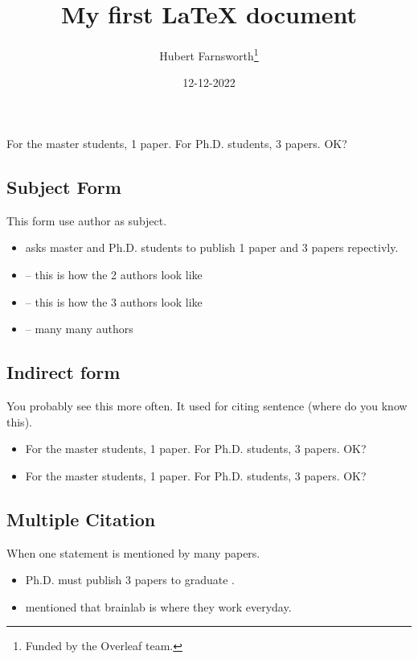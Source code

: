 \documentclass{article}
\title{My first LaTeX document}
\author{Hubert Farnsworth\thanks{Funded by the Overleaf team.}}
\date{12-12-2022}
\begin{document}
\maketitle
\tableofcontents




For the master students, 1 paper. For  Ph.D. students, 3 papers. OK? \cite{bcilab}

\subsection{Subject Form}

This form use author as subject.

\begin{itemize}
    \item \textcite{bcilab} asks master and Ph.D. students to publish 1 paper and 3 papers repectivly.
    \item \textcite{2author} -- this is how the 2 authors look like
    \item \textcite{3author} -- this is how the 3 authors look like
    \item \textcite{vaswani2017attention} -- many many authors
\end{itemize}

\subsection{Indirect form}

You probably see this more often. It used for citing sentence (where do you know this).

\begin{itemize}
    \item For the master students, 1 paper. For  Ph.D. students, 3 papers. OK? \parencite{bcilab}
    \item For the master students, 1 paper. For  Ph.D. students, 3 papers. OK? \parencite[18-20]{bcilab}
\end{itemize}

\subsection{Multiple Citation}

When one statement is mentioned by many papers.

\begin{itemize}
    \item Ph.D. must publish 3 papers to graduate \parencite{bcilab,2author,3author}.
    \item \textcite{2author, 3author} mentioned that brainlab is where they work everyday.
\end{itemize}

\printbibliography %
\end{document}

